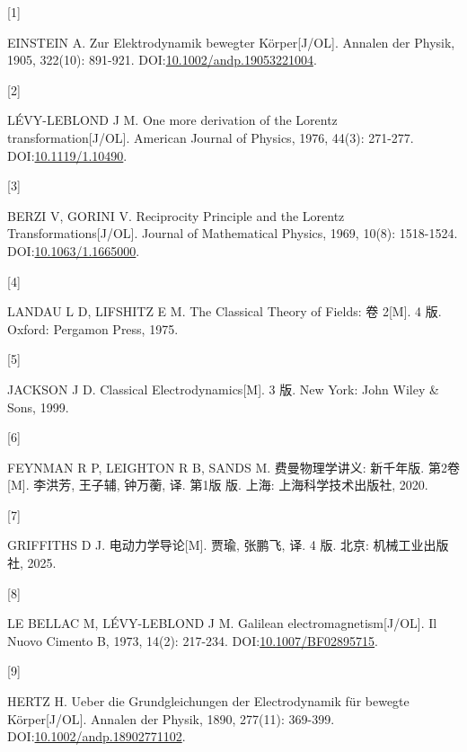 \documentclass[
  chinese,
  a4paper,
  UTF8,
  12pt,
  oneside,
  openany]{ctexbook}
\newlength{\cslhangindent}
\newlength{\csllabelwidth}
\newenvironment{CSLReferences}[2] %
 {\begin{list}{}{%
  \setlength{\itemindent}{0pt}
  \setlength{\leftmargin}{0pt}
  \setlength{\parsep}{0pt}
  \ifodd #1
   \setlength{\leftmargin}{\cslhangindent}
   \setlength{\itemindent}{-1\cslhangindent}
  \fi
  \setlength{\itemsep}{#2\baselineskip}}}
 {\end{list}}
\newcommand{\CSLLeftMargin}[1]{\parbox[t]{\csllabelwidth}{\strut#1\strut}}
\newcommand{\CSLRightInline}[1]{\parbox[t]{\linewidth - \csllabelwidth}{\strut#1\strut}}
\theoremstyle{plain}
\theoremstyle{plain}
\theoremstyle{plain}
\theoremstyle{definition}
\theoremstyle{plain}
\theoremstyle{plain}
\theoremstyle{remark}
\begin{document}
\protect{}\label{refs}
\begin{CSLReferences}{0}{0}
\CSLLeftMargin{{[}1{]} }%
\CSLRightInline{EINSTEIN A. Zur Elektrodynamik bewegter
K{ö}rper{[}J/OL{]}. Annalen der Physik, 1905, 322(10): 891-921.
DOI:\href{https://doi.org/10.1002/andp.19053221004}{10.1002/andp.19053221004}.}

\CSLLeftMargin{{[}2{]} }%
\CSLRightInline{LÉVY-LEBLOND J M. One more derivation of the Lorentz
transformation{[}J/OL{]}. American Journal of Physics, 1976, 44(3):
271-277. DOI:\href{https://doi.org/10.1119/1.10490}{10.1119/1.10490}.}

\CSLLeftMargin{{[}3{]} }%
\CSLRightInline{BERZI V, GORINI V. Reciprocity Principle and the Lorentz
Transformations{[}J/OL{]}. Journal of Mathematical Physics, 1969, 10(8):
1518-1524.
DOI:\href{https://doi.org/10.1063/1.1665000}{10.1063/1.1665000}.}

\CSLLeftMargin{{[}4{]} }%
\CSLRightInline{LANDAU L D, LIFSHITZ E M. The Classical Theory of
Fields: 卷 2{[}M{]}. 4 版. Oxford: Pergamon Press, 1975.}

\CSLLeftMargin{{[}5{]} }%
\CSLRightInline{JACKSON J D. Classical Electrodynamics{[}M{]}. 3 版. New
York: John Wiley \& Sons, 1999.}

\CSLLeftMargin{{[}6{]} }%
\CSLRightInline{FEYNMAN R P, LEIGHTON R B, SANDS M. 费曼物理学讲义:
新千年版. 第2卷{[}M{]}. 李洪芳, 王子辅, 钟万蘅, 译. 第1版 版. 上海:
上海科学技术出版社, 2020.}

\CSLLeftMargin{{[}7{]} }%
\CSLRightInline{GRIFFITHS D J. 电动力学导论{[}M{]}. 贾瑜, 张鹏飞, 译. 4
版. 北京: 机械工业出版社, 2025.}

\CSLLeftMargin{{[}8{]} }%
\CSLRightInline{LE BELLAC M, LÉVY-LEBLOND J M. Galilean
electromagnetism{[}J/OL{]}. Il Nuovo Cimento B, 1973, 14(2): 217-234.
DOI:\href{https://doi.org/10.1007/BF02895715}{10.1007/BF02895715}.}

\CSLLeftMargin{{[}9{]} }%
\CSLRightInline{HERTZ H. Ueber die Grundgleichungen der Electrodynamik
f{ü}r bewegte K{ö}rper{[}J/OL{]}. Annalen der Physik, 1890, 277(11):
369-399.
DOI:\href{https://doi.org/10.1002/andp.18902771102}{10.1002/andp.18902771102}.}


\end{CSLReferences}
\end{document}
